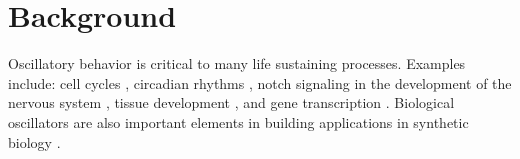 \documentclass{bmcart}
\begin{document}
\begin{frontmatter}
\begin{abstractbox}
\begin{abstract}
\end{abstract}


\begin{keyword}
\end{keyword}


\end{abstractbox}
%

\end{frontmatter}





\section*{Background}
Oscillatory behavior is critical to many life sustaining processes. Examples include: cell cycles \cite{Murray1991}, circadian rhythms \cite{capper_overview_2001}, notch signaling in the development of the nervous system \cite{wang_neural_2011}, tissue development \cite{goodwin1969}, and gene transcription \cite{nelson2004}.
Biological oscillators are also important elements in building applications in synthetic biology \cite{Perry2012, zhang_independent_2022, Elowitz2000}.
\end{document}
